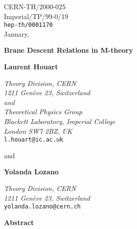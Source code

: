 \documentclass[12pt,a4paper]{article}
\begin{document}
\begin{flushright}
\footnotesize
\footnotesize
CERN-TH/2000-025\\
Imperial/TP/99-0/19\\
{\tt hep-th/0001170}\\
January, \coordHE{}
\normalsize
\end{flushright}

\begin{center}



\vspace{.8cm}
{\LARGE {\bf Brane Descent Relations in M-theory}}

\vspace{1cm}


{\bf Laurent Houart}

\vspace{.1cm}

{
{\it Theory Division, CERN\\
1211 Gen\`eve 23, Switzerland\\
and \\
Theoretical Physics Group\\
Blackett Laboratory,
Imperial College \\
London SW7 2BZ, UK}\\
{\tt l.houart@ic.ac.uk}
}

\vspace{.3cm}

{and}

\vspace{.3cm}


{\bf Yolanda Lozano}

\vspace{.1cm}

{
{\it Theory Division, CERN\\
1211 Gen\`eve 23, Switzerland}\\
{\tt yolanda.lozano@cern.ch}
}

\vspace{.4cm}



\vspace{1cm}


{\bf Abstract}

\end{center}
\end{document}
